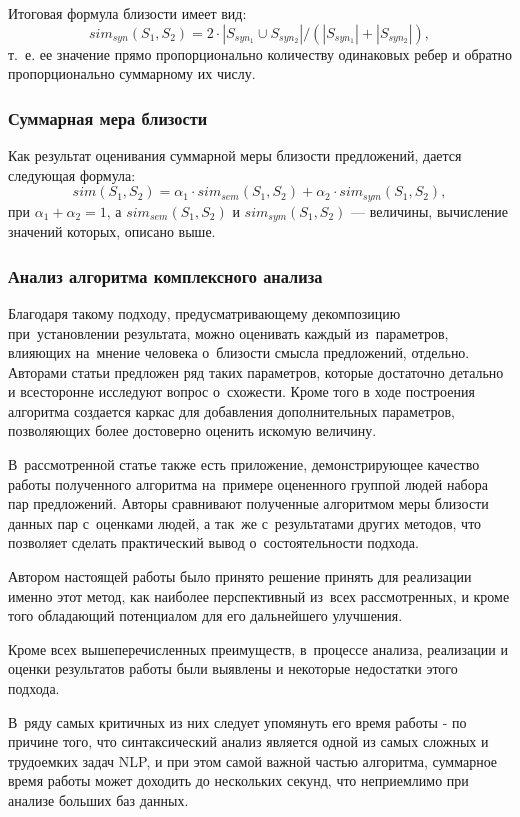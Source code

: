 Итоговая формула близости имеет вид: 
$$sim_{syn}(S_1, S_2) = 2 \cdot |S_{syn_1} \cup S_{syn_2}| / (|S_{syn_1}| + |S_{syn_2}|),$$ 
т.~е. ее значение прямо пропорционально количеству одинаковых ребер
и обратно пропорционально суммарному их числу.

\subsubsection{Суммарная мера близости}

Как результат оценивания суммарной меры близости предложений, 
дается следующая формула:
$$sim(S_1, S_2) = \alpha_1 \cdot sim_{sem}(S_1, S_2) + \alpha_2 \cdot sim_{sym}(S_1, S_2),$$
 при $\alpha_1+\alpha_2=1$,
а $sim_{sem}(S_1, S_2)$ и 
$sim_{sym}(S_1, S_2)$ --- величины, вычисление значений которых, описано выше.

\subsubsection{Анализ алгоритма комплексного анализа}
\label{sec:complex_algorithm_analysis}
Благодаря такому подходу, предусматривающему декомпозицию при~установлении результата, 
можно оценивать каждый из~параметров, влияющих на~мнение человека о~близости смысла предложений, отдельно. 
Авторами статьи предложен ряд таких параметров, 
которые достаточно детально и всесторонне исследуют вопрос о~схожести. Кроме того
в ходе построения алгоритма создается каркас для добавления дополнительных параметров,
позволяющих более достоверно оценить искомую величину. 

В~рассмотренной статье\cite{complexSim} также есть приложение, демонстрирующее качество работы
полученного алгоритма на~примере оцененного группой людей набора пар предложений.
Авторы сравнивают полученные алгоритмом меры близости данных пар с~оценками людей, 
а так~же с~результатами других методов, что позволяет сделать практический вывод
о~состоятельности подхода.

Автором настоящей работы было принято решение принять для реализации именно этот метод,
как наиболее перспективный из~всех рассмотренных, и кроме того обладающий
потенциалом для его дальнейшего улучшения.

Кроме всех вышеперечисленных преимуществ, в~процессе анализа, 
реализации и оценки результатов работы были выявлены
и некоторые недостатки этого подхода.

В~ряду самых критичных из них следует упомянуть его время работы - 
по причине того, что синтаксический анализ является одной из самых
сложных и трудоемких задач NLP, и при этом самой важной частью алгоритма,
суммарное время работы может доходить до нескольких секунд,
что неприемлимо при анализе больших баз данных.

